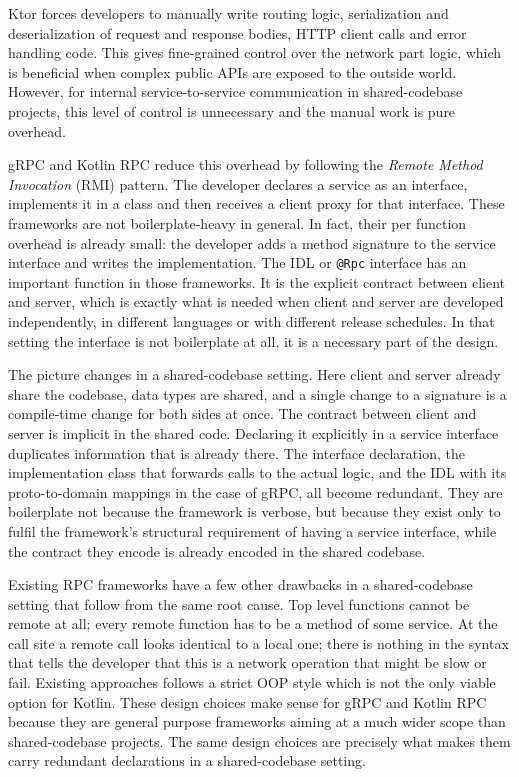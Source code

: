 \documentclass[a4paper,11pt,oneside]{article}
\newcommand{\term}[1]{\textit{#1}}
\newcommand{\kotlini}[1]{\texttt{#1}}
\begin{document}
Ktor forces developers to manually write routing logic, serialization and deserialization of
request and response bodies, HTTP client calls and error handling code. This gives fine-grained
control over the network part logic, which is beneficial when complex public APIs are exposed to
the outside world. However, for internal service-to-service communication in shared-codebase
projects, this level of control is unnecessary and the manual work is pure overhead.

gRPC and Kotlin RPC reduce this overhead by following the \term{Remote Method Invocation} (RMI)
pattern. The developer declares a service as an interface, implements it in a class and then receives a
client proxy for that interface. These frameworks are not boilerplate-heavy in general. In fact,
their per function overhead is already small: the developer adds a method signature to the service
interface and writes the implementation. The IDL or \kotlini{@Rpc} interface has an important
function in those frameworks. It is the explicit contract between client and server, which is exactly
what is needed when client and server are developed independently, in different languages or with
different release schedules. In that setting the interface is not boilerplate at all, it is a
necessary part of the design.

The picture changes in a shared-codebase setting. Here client and server already share the codebase,
data types are shared, and a single change to a signature is a compile-time change for both sides
at once. The contract between client and server is implicit in the shared code. Declaring it
explicitly in a service interface duplicates information that is already there. The interface
declaration, the implementation class that forwards calls to the actual logic, and the IDL with its
proto-to-domain mappings in the case of gRPC, all become redundant. They are boilerplate not because
the framework is verbose, but because they exist only to fulfil the framework's structural
requirement of having a service interface, while the contract they encode is already encoded in
the shared codebase.

Existing RPC frameworks have a few other drawbacks in a shared-codebase setting that follow from the
same root cause. Top level functions cannot be remote at all; every remote function has to be a
method of some service. At the call site a remote call looks identical to a local one; there is
nothing in the syntax that tells the developer that this is a network operation that might be slow or
fail. Existing approaches follows a strict OOP style which is not the only viable option for Kotlin. These
design choices make sense for gRPC and Kotlin RPC because they are general purpose frameworks
aiming at a much wider scope than shared-codebase projects. The same design choices are precisely
what makes them carry redundant declarations in a shared-codebase setting.
\end{document}
